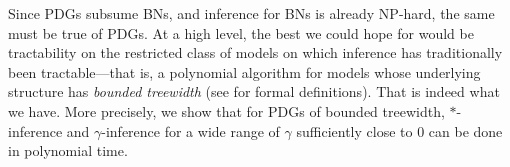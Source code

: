 \documentclass[twoside]{article}
\begin{document}


Since PDGs subsume BNs, and 
inference for BNs is already NP-hard, the same must be true of 
PDGs.
At a high level, the best we could hope for would be tractability on the restricted
class of models on which inference has traditionally been tractable---that is, a polynomial algorithm for models whose
underlying structure has \emph{bounded treewidth} (see
 for formal definitions).
That is indeed what we have.  More precisely, we show that for PDGs of
bounded treewidth, $*$-inference and $\gamma$-inference for a wide
range of $\gamma$ sufficiently close to 0 can be done in polynomial time.
\end{document}
